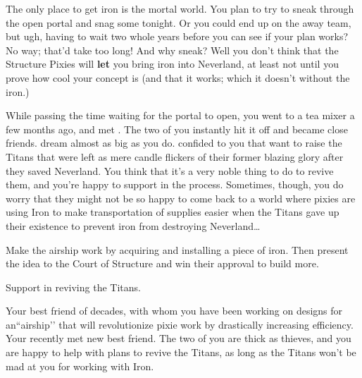 \documentclass[char]{PP}
\begin{document}
The only place to get iron is the mortal world. You plan to try to sneak through the open portal and snag some tonight. Or you could end up on the away team, but ugh, having to wait two whole years before you can see if your plan works? No way; that'd take too long! And why sneak? Well you don't think that the Structure Pixies will \textbf{let} you bring iron into Neverland, at least not until you prove how cool your concept is (and that it works; which it doesn't without the iron.)

While passing the time waiting for the portal to open, you went to a tea mixer a few months ago, and met \cFTitan{}. The two of you instantly hit it off and became close friends. \cFTitan{\They} dream\cFTitan{\plural} almost as big as you do. \cFTitan{} confided to you that \cFTitan{\they} want\cFTitan{\plural} to raise the Titans that were left as mere candle flickers of their former blazing glory after they saved Neverland. You think that it's a very noble thing to do to revive them, and you're happy to support \cFTitan{} in the process. Sometimes, though, you do worry that they might not be so happy to come back to a world where pixies are using Iron to make transportation of supplies easier when the Titans gave up their existence to prevent iron from destroying Neverland\ldots


\begin{itemz}
	\item Make the airship work by acquiring and installing a piece of iron. Then present the idea to the Court of Structure and win their approval to build more.
	\item Support \cFTitan{} in reviving the Titans.
\end{itemz}

\begin{itemz}[Notes]
	\item 
\end{itemz}

\begin{contacts}
	\contact{\cMAirship{}} Your best friend of decades, with whom you have been working on designs for an``airship'’ that will revolutionize pixie work by drastically increasing efficiency.
	\contact{\cFTitan{}} Your recently met new best friend. The two of you are thick as thieves, and you are happy to help \cFTitan{\them} with \cFTitan{\their} plans to revive the Titans, as long as the Titans won't be mad at you for working with Iron.
\end{contacts}
\end{document}
